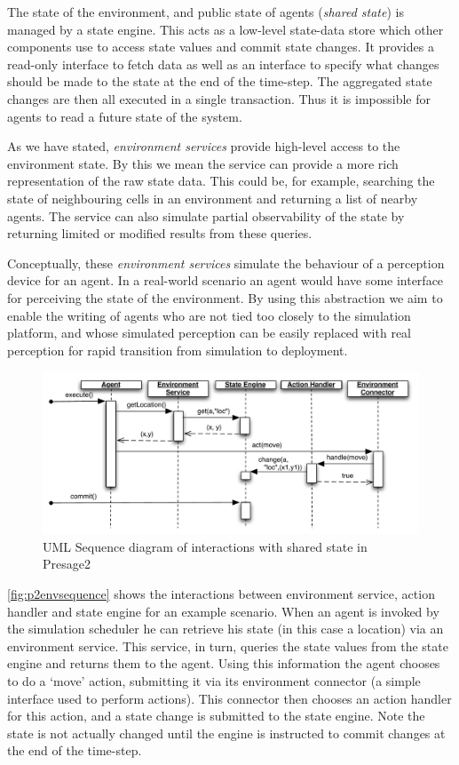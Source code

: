 The state of the environment, and public state of agents (\emph{shared state})
is managed by a state engine. This acts as a low-level state-data store which
other components use to access state values and commit state changes. It
provides a read-only interface to fetch data as well as an interface to
specify what changes should be made to the state at the end of the time-step.
The aggregated state changes are then all executed in a single transaction.
Thus it is impossible for agents to read a future state of the system.

As we have stated, \emph{environment services} provide high-level access to
the environment state. By this we mean the service can provide a more rich
representation of the raw state data. This could be, for example, searching
the state of neighbouring cells in an environment and returning a list of
nearby agents. The service can also simulate partial observability of the
state by returning limited or modified results from these queries.

Conceptually, these \emph{environment services} simulate the behaviour of a
perception device for an agent. In a real-world scenario an agent would have
some interface for perceiving the state of the environment. By using this
abstraction we aim to enable the writing of agents who are not tied too closely
to the simulation platform, and whose simulated perception can be easily
replaced with real perception for rapid transition from simulation to
deployment.

\begin{figure}
\caption{UML Sequence diagram of interactions with shared state in Presage2}\label{fig:p2envsequence}
\includegraphics[width=\linewidth]{gfx/presage2/environment_sequence}
\end{figure}

\autoref{fig:p2envsequence} shows the interactions between environment
service, action handler and state engine for an example scenario. When an
agent is invoked by the simulation scheduler he can retrieve his state (in
this case a location) via an environment service. This service, in turn,
queries the state values from the state engine and returns them to the agent.
Using this information the agent chooses to do a `move' action, submitting it
via its environment connector (a simple interface used to perform actions).
This connector then chooses an action handler for this action, and a state
change is submitted to the state engine. Note the state is not actually
changed until the engine is instructed to commit changes at the end of the
time-step.

